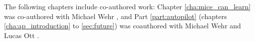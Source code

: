 The following chapters include co-authored work: Chapter \ref{cha:mice_can_learn} was co-authored with Michael Wehr \cite{saundersMiceCanLearn2019}, and Part \ref{part:autopilot} (chapters \ref{cha:ap_introduction} to \ref{sec:future}) was coauthored with Michael Wehr and Lucas Ott \cite{saundersAUTOPILOTAutomatingExperiments2022}.